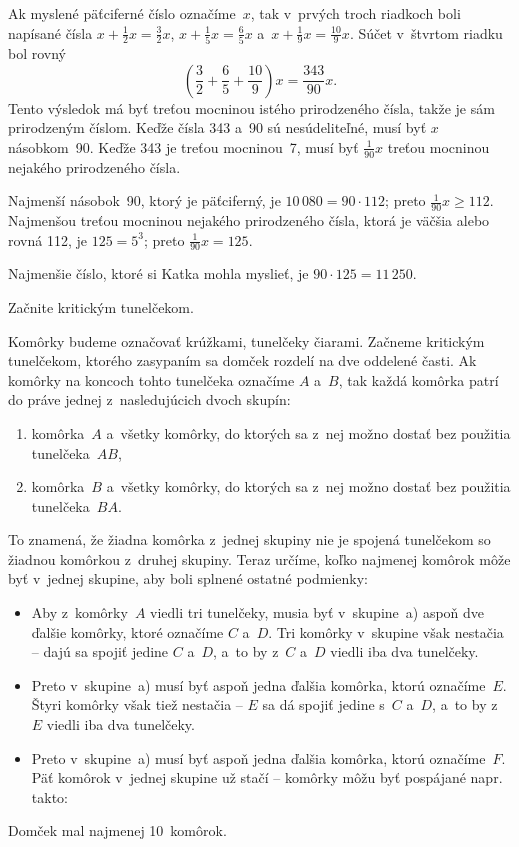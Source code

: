 {%
Ak myslené päťciferné číslo označíme~$x$, tak v~prvých troch riadkoch boli napísané čísla
$x+\frac12x=\frac32x$, $x+\frac15x=\frac65x$ a~$x+\frac19x=\frac{10}9x$.
Súčet v~štvrtom riadku bol rovný
$$
\left( \frac32+\frac65+\frac{10}9 \right)x=\frac{343}{90}x.
$$
Tento výsledok má byť treťou mocninou istého prirodzeného čísla, takže je sám prirodzeným číslom.
Keďže čísla 343 a~90 sú nesúdeliteľné, musí byť $x$ násobkom~90.
Keďže 343 je treťou mocninou~7, musí byť $\frac1{90}{x}$ treťou mocninou nejakého prirodzeného čísla.

Najmenší násobok~90, ktorý je päťciferný, je $10\,080=90\cdot112$; preto $\frac1{90}{x}\ge 112$.
Najmenšou treťou mocninou nejakého prirodzeného čísla, ktorá je väčšia alebo rovná 112, je $125=5^3$; preto $\frac1{90}{x}=125$.

Najmenšie číslo, ktoré si Katka mohla myslieť, je $90\cdot125=11\,250$.

}

{%
\napad
Začnite kritickým tunelčekom.

\riesenie
Komôrky budeme označovať krúžkami, tunelčeky čiarami.
Začneme kritickým tunelčekom, ktorého zasypaním sa domček rozdelí na dve oddelené časti.
Ak komôrky na koncoch tohto tunelčeka označíme $A$ a~$B$, tak
každá komôrka patrí do práve jednej z~nasledujúcich dvoch skupín:
\begin{enumerate}\alphatrue
\item komôrka~$A$ a~všetky komôrky, do ktorých sa z~nej možno dostať bez použitia tunelčeka~$AB$,
\item komôrka~$B$ a~všetky komôrky, do ktorých sa z~nej možno dostať bez použitia tunelčeka~$BA$.
\end{enumerate}
To znamená, že žiadna komôrka z~jednej skupiny nie je spojená tunelčekom so žiadnou komôrkou z~druhej skupiny.
Teraz určíme, koľko najmenej komôrok môže byť v~jednej skupine, aby boli splnené ostatné podmienky:
\begin{itemize}
\item
Aby z~komôrky~$A$ viedli tri tunelčeky, musia byť v~skupine~a) aspoň dve ďalšie komôrky, ktoré označíme $C$ a~$D$.
Tri komôrky v~skupine však nestačia -- dajú sa spojiť jedine $C$ a~$D$, a~to by z~$C$ a~$D$ viedli iba dva tunelčeky.
\item
Preto v~skupine~a) musí byť aspoň jedna ďalšia komôrka, ktorú označíme~$E$.
Štyri komôrky však tiež nestačia -- $E$ sa dá spojiť jedine s~$C$ a~$D$, a~to by z~$E$ viedli iba dva tunelčeky.
\item
Preto v~skupine~a) musí byť aspoň jedna ďalšia komôrka, ktorú označíme~$F$.
Päť komôrok v~jednej skupine už stačí -- komôrky môžu byť pospájané napr. takto:
%
\end{itemize}


Domček mal najmenej 10~komôrok.
}

